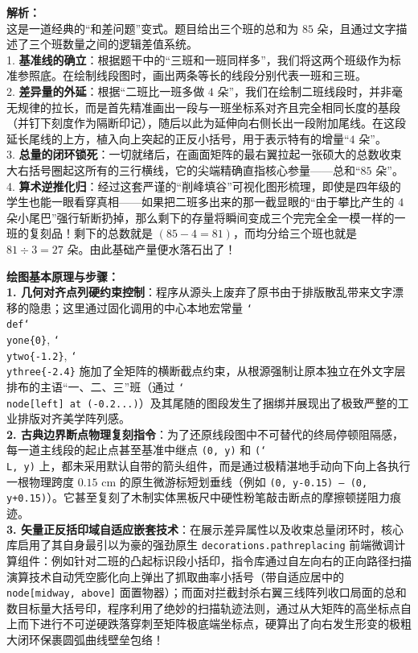 {\small\color{gray}
\textbf{解析：}\\
这是一道经典的“和差问题”变式。题目给出三个班的总和为 $85$ 朵，且通过文字描述了三个班数量之间的逻辑差值系统。\\
1. \textbf{基准线的确立}：根据题干中的“三班和一班同样多”，我们将这两个班级作为标准参照底。在绘制线段图时，画出两条等长的线段分别代表一班和三班。\\
2. \textbf{差异量的外延}：根据“二班比一班多做 $4$ 朵”，我们在绘制二班线段时，并非毫无规律的拉长，而是首先精准画出一段与一班坐标系对齐且完全相同长度的基段（并钉下刻度作为隔断印记），随后以此为延伸向右侧长出一段附加尾线。在这段延长尾线的上方，植入向上突起的正反小括号，用于表示特有的增量“$4$ 朵”。\\
3. \textbf{总量的闭环锁死}：一切就绪后，在画面矩阵的最右翼拉起一张硕大的总数收束大右括号圈起这所有的三行横线，它的尖端精确直指核心参量——总和“$85$ 朵”。\\
4. \textbf{算术逆推化归}：经过这套严谨的“削峰填谷”可视化图形梳理，即使是四年级的学生也能一眼看穿真相——如果把二班多出来的那一截显眼的“由于攀比产生的 $4$ 朵小尾巴”强行斩断扔掉，那么剩下的存量将瞬间变成三个完完全全一模一样的一班的复刻品！剩下的总数就是 $(85-4=81)$，而均分给三个班也就是 $81 \div 3 = 27$ 朵。由此基础产量便水落石出了！
}

\vspace{0.6cm}

{\small\color{blue!70!black}
\textbf{绘图基本原理与步骤：}\\
\textbf{1. 几何对齐点列硬约束控制}：程序从源头上废弃了原书由于排版散乱带来文字漂移的隐患；这里通过固化调用的中心本地宏常量 \texttt{\char`\\def\char`\\yone\{0\}}, \texttt{\char`\\ytwo\{-1.2\}}, \texttt{\char`\\ythree\{-2.4\}} 施加了全矩阵的横断截点约束，从根源强制让原本独立在外文字层排布的主语“一、二、三”班（通过 \texttt{\char`\\node[left] at (-0.2...)}）及其尾随的图段发生了捆绑并展现出了极致严整的工业排版对齐美学阵列感。\\
\textbf{2. 古典边界断点物理复刻指令}：为了还原线段图中不可替代的终局停顿阻隔感，每一道主线段的起止点甚至基准中继点 \texttt{(0, y)} 和 \texttt{(\char`\\L, y)} 上，都未采用默认自带的箭头组件，而是通过极精湛地手动向下向上各执行一根物理跨度 $0.15\text{ cm}$ 的原生微游标短划垂线（例如 \texttt{(0, y-0.15) -- (0, y+0.15)}）。它甚至复刻了木制实体黑板尺中硬性粉笔敲击断点的摩擦顿搓阻力痕迹。\\
\textbf{3. 矢量正反括印域自适应嵌套技术}：在展示差异属性以及收束总量闭环时，核心库启用了其自身最引以为豪的强劲原生 \texttt{decorations.pathreplacing} 前端微调计算组件：例如针对二班的凸起标识段小括印，指令库通过自左向右的正向路径扫描演算技术自动凭空膨化向上弹出了抓取曲率小括号（带自适应居中的 \texttt{node[midway, above]} 面置物器）；而面对拦截封杀右翼三线阵列收口局面的总和数目标量大括号印，程序利用了绝妙的扫描轨迹法则，通过从大矩阵的高坐标点自上而下进行不可逆硬跌落穿刺至矩阵极底端坐标点，硬算出了向右发生形变的极粗大闭环保裹圆弧曲线壁垒包络！
}

